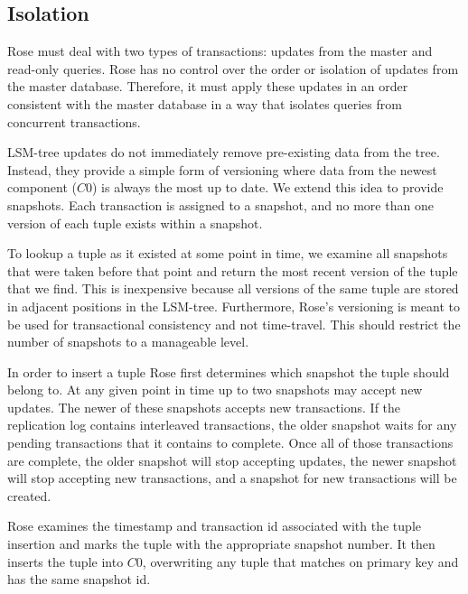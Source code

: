\documentclass{vldb}
\newcommand{\rows}{Rose\xspace}
\newcommand{\rowss}{Rose's\xspace}
\begin{document}



\subsection{Isolation}
\label{sec:isolation}

\rows must deal with two types of transactions: updates from the
master and read-only queries.  \rows has no control over the order or
isolation of updates from the master database.  Therefore, it must
apply these updates in an order consistent with the master database
in a way that isolates queries from concurrent transactions.

LSM-tree updates do not immediately remove pre-existing data
from the tree.  Instead, they provide a simple form of versioning
where data from the newest component ($C0$) is always the most up to
date.  We extend this idea to provide snapshots.  Each transaction is
assigned to a snapshot, and no more than one version of each tuple
exists within a snapshot.

To lookup a tuple as it existed at some point in time, we examine all
snapshots that were taken before that point and return the most recent
version of the tuple that we find.  This is inexpensive because all versions of the same tuple are
stored in adjacent positions in the LSM-tree.  Furthermore, \rowss versioning is meant to be
used for transactional consistency and not time-travel.  This should
restrict the number of snapshots to a manageable level.

In order to insert a tuple \rows first determines which snapshot the
tuple should belong to.  At any given point in time up to two snapshots
may accept new updates.  The newer of these snapshots accepts new
transactions.  If the replication log contains interleaved transactions,
the older snapshot waits for any pending transactions that
it contains to complete.  Once all of those transactions are complete,
the older snapshot will stop accepting updates, the newer snapshot
will stop accepting new transactions, and a snapshot for new
transactions will be created.

\rows examines the timestamp and transaction id associated with the tuple insertion
and marks the tuple with the appropriate snapshot number.  It then
inserts the tuple into $C0$, overwriting any tuple that matches on
primary key and has the same snapshot id.
\end{document}
